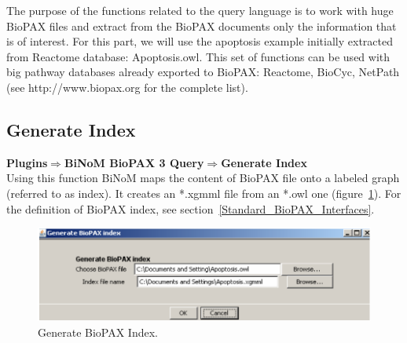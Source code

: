 The purpose of the functions related to the query language is to work with huge BioPAX files and extract from the BioPAX documents only the information that is of interest. For this part, we will use the apoptosis example initially extracted from Reactome database: Apoptosis.owl. This set of functions can be used with big pathway databases already exported to BioPAX: Reactome, BioCyc, NetPath (see http://www.biopax.org for the complete list).

\subsection{Generate Index}
\textbf{Plugins$\Rightarrow$BiNoM BioPAX 3 Query$\Rightarrow$Generate Index}\\
Using this function BiNoM maps the content of BioPAX file onto a labeled graph (referred to as index). It creates an *.xgmml file from an *.owl one (figure~\ref{Generate_BioPAX_Index}). For the definition of BioPAX index, see section~\ref{Standard_BioPAX_Interfaces}.
\begin{figure}[h]
\centering
\includegraphics[width=18 cm]{graphics/Generate_BioPAX_Index}
\caption{Generate BioPAX Index.}
\label{Generate_BioPAX_Index}
\end{figure}

